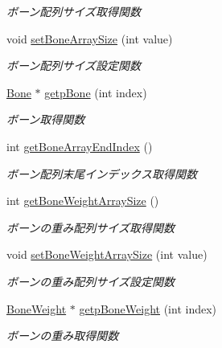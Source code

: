 \begin{DoxyCompactItemize}
\begin{DoxyCompactList}\small\item\em ボーン配列サイズ取得関数 \end{DoxyCompactList}\item 
void \mbox{\hyperlink{class_md_bin_data_1_1_mesh_a8b8125b4e6e716421edbe6e712b5615a}{set\+Bone\+Array\+Size}} (int value)
\begin{DoxyCompactList}\small\item\em ボーン配列サイズ設定関数 \end{DoxyCompactList}\item 
\mbox{\hyperlink{class_md_bin_data_1_1_mesh_1_1_bone}{Bone}} $\ast$ \mbox{\hyperlink{class_md_bin_data_1_1_mesh_a399b02c6aec7bdcf7eae52e846797c90}{getp\+Bone}} (int index)
\begin{DoxyCompactList}\small\item\em ボーン取得関数 \end{DoxyCompactList}\item 
int \mbox{\hyperlink{class_md_bin_data_1_1_mesh_a68304ec3065607d8e1a7ed775f53d95a}{get\+Bone\+Array\+End\+Index}} ()
\begin{DoxyCompactList}\small\item\em ボーン配列末尾インデックス取得関数 \end{DoxyCompactList}\item 
int \mbox{\hyperlink{class_md_bin_data_1_1_mesh_a1ba626e81e0b44f7bd7f2963129655ec}{get\+Bone\+Weight\+Array\+Size}} ()
\begin{DoxyCompactList}\small\item\em ボーンの重み配列サイズ取得関数 \end{DoxyCompactList}\item 
void \mbox{\hyperlink{class_md_bin_data_1_1_mesh_a1b779f82008537dd14cfac4b8819620a}{set\+Bone\+Weight\+Array\+Size}} (int value)
\begin{DoxyCompactList}\small\item\em ボーンの重み配列サイズ設定関数 \end{DoxyCompactList}\item 
\mbox{\hyperlink{class_md_bin_data_1_1_mesh_1_1_bone_weight}{Bone\+Weight}} $\ast$ \mbox{\hyperlink{class_md_bin_data_1_1_mesh_a43570a3e37d3b9a799df8766cefca78c}{getp\+Bone\+Weight}} (int index)
\begin{DoxyCompactList}\small\item\em ボーンの重み取得関数 \end{DoxyCompactList}\item 

\end{DoxyCompactItemize}
